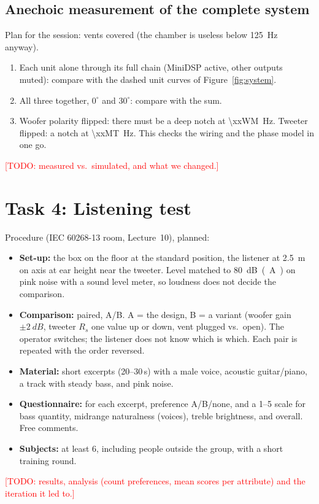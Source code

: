 \documentclass[a4paper,10pt]{article}
\newcommand{\todo}[1]{\textcolor{red}{[TODO: #1]}}
\begin{document}
\subsection{Anechoic measurement of the complete system}
Plan for the session: vents covered (the chamber is useless below \SI{125}{Hz} anyway).
\begin{enumerate}
\item Each unit alone through its full chain (MiniDSP active, other outputs muted): compare with the
  dashed unit curves of Figure~\ref{fig:system}.
\item All three together, $0^\circ$ and $30^\circ$: compare with the sum.
\item Woofer polarity flipped: there must be a deep notch at \SI{\xxWM}{Hz}. Tweeter flipped: a notch
  at \SI{\xxMT}{Hz}. This checks the wiring and the phase model in one go.
\end{enumerate}
\todo{measured vs.\ simulated, and what we changed.}

\section{Task 4: Listening test}
Procedure (IEC 60268-13 room, Lecture~10), planned:
\begin{itemize}
\item \textbf{Set-up:} the box on the floor at the standard position, the listener at \SI{2.5}{m} on
  axis at ear height near the tweeter. Level matched to \SI{80}{dB(A)} on pink noise with a sound
  level meter, so loudness does not decide the comparison.
\item \textbf{Comparison:} paired, A/B. A = the design, B = a variant (woofer gain $\pm\SI{2}{dB}$,
  tweeter $R_s$ one value up or down, vent plugged vs.\ open). The operator switches; the listener does
  not know which is which. Each pair is repeated with the order reversed.
\item \textbf{Material:} short excerpts (20--30\,s) with a male voice, acoustic guitar/piano, a track
  with steady bass, and pink noise.
\item \textbf{Questionnaire:} for each excerpt, preference A/B/none, and a 1--5 scale for bass
  quantity, midrange naturalness (voices), treble brightness, and overall. Free comments.
\item \textbf{Subjects:} at least 6, including people outside the group, with a short training round.
\end{itemize}
\todo{results, analysis (count preferences, mean scores per attribute) and the iteration it led to.}
\end{document}
